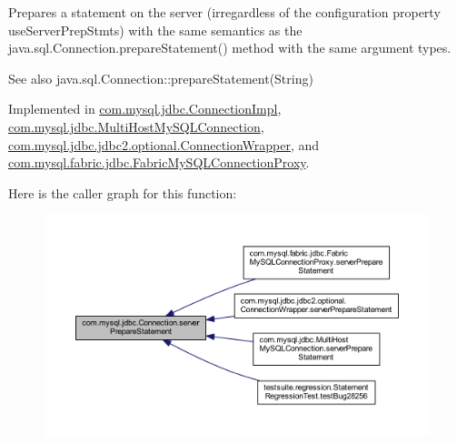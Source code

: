Prepares a statement on the server (irregardless of the configuration property \textquotesingle{}use\+Server\+Prep\+Stmts\textquotesingle{}) with the same semantics as the java.\+sql.\+Connection.\+prepare\+Statement() method with the same argument types.

\begin{DoxySeeAlso}{See also}
java.\+sql.\+Connection\+::prepare\+Statement(\+String) 
\end{DoxySeeAlso}


Implemented in \mbox{\hyperlink{classcom_1_1mysql_1_1jdbc_1_1_connection_impl_a32bbaa44990d6c0094b9697bf298bb60}{com.\+mysql.\+jdbc.\+Connection\+Impl}}, \mbox{\hyperlink{classcom_1_1mysql_1_1jdbc_1_1_multi_host_my_s_q_l_connection_a7a111a6315de5d2c9b08f5e4d4f84fed}{com.\+mysql.\+jdbc.\+Multi\+Host\+My\+S\+Q\+L\+Connection}}, \mbox{\hyperlink{classcom_1_1mysql_1_1jdbc_1_1jdbc2_1_1optional_1_1_connection_wrapper_a75b41a04d4e8c60fd30e3ec13abccaa0}{com.\+mysql.\+jdbc.\+jdbc2.\+optional.\+Connection\+Wrapper}}, and \mbox{\hyperlink{classcom_1_1mysql_1_1fabric_1_1jdbc_1_1_fabric_my_s_q_l_connection_proxy_a1acde7226641989bf319992e99bc45f5}{com.\+mysql.\+fabric.\+jdbc.\+Fabric\+My\+S\+Q\+L\+Connection\+Proxy}}.

Here is the caller graph for this function\+:\nopagebreak
\begin{figure}[H]
\begin{center}
\leavevmode
\includegraphics[width=350pt]{interfacecom_1_1mysql_1_1jdbc_1_1_connection_a6e2680bb0a1c38613a4788de1916b596_icgraph}
\end{center}
\end{figure}
\mbox{\label{interfacecom_1_1mysql_1_1jdbc_1_1_connection_ab063bf6d934fba06ba65eaa68aa06ef6}} 
